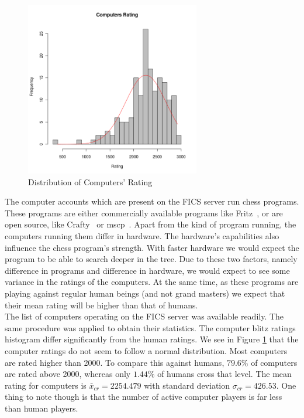 \documentclass{article}
\begin{document}
\begin{figure} [htp]
\begin{center}
\includegraphics[width=3in]{computers_rating.png}
\end{center}
\caption{Distribution of Computers' Rating}
\label{fig:comprating}
\end{figure}


The computer accounts which are present on the FICS server run chess programs. These programs are either commercially available programs like Fritz~\cite{web:fritz}, or are open source, like Crafty~\cite{web:crafty} or mscp~\cite{web:mscp}. Apart from the kind of program running, the computers running them differ in hardware. The hardware's capabilities also influence the chess program's strength. With faster hardware we would expect the program to be able to search deeper in the tree. Due to these two factors, namely difference in programs and difference in hardware, we would expect to see some variance in the ratings of the computers. At the same time, as these programs are playing against regular human beings (and not grand masters) we expect that their mean rating will be higher than that of humans. \\

The list of computers operating on the FICS server was available readily. The same procedure was applied to obtain their statistics. The computer blitz ratings histogram differ significantly from the human ratings. We see in Figure \ref{fig:comprating} that the computer ratings do not seem to follow a normal distribution. Most computers are rated higher than 2000. To compare this against humans, $79.6\%$ of computers are rated above 2000, whereas only $1.44\%$ of humans cross that level. The mean rating for computers is $\bar{x}_{cr} = 2254.479$ with standard deviation $\sigma_{cr} = 426.53$. One thing to note though is that the number of active computer players is far less than human players.\\
\end{document}
